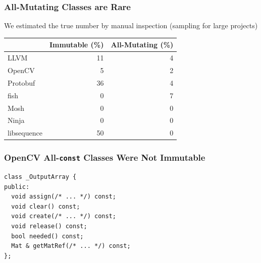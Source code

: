 \documentclass[aspectratio=169]{beamer}
\begin{document}
  \begin{frame}
    \frametitle{All-Mutating Classes are Rare}

    We estimated the true number by manual inspection (sampling for large
    projects)

    \vspace{2em}

    \begin{center}\begin{tabular}{l r r}
                  & Immutable (\%) & All-Mutating (\%) \\
      \hline
      LLVM        & 11 & 4 \\
      OpenCV      &  5 & 2 \\
      Protobuf    & 36 & 4 \\
      fish        &  0 & 7 \\
      Mosh        &  0 & 0 \\
      Ninja       &  0 & 0 \\
      libsequence & 50 & 0 \\
    \end{tabular}\end{center}
  \end{frame}

  \begin{frame}[fragile]
    \frametitle{OpenCV All-\texttt{const} Classes Were Not Immutable}

    \begin{lstlisting}
class _OutputArray {
public:
  void assign(/* ... */) const;
  void clear() const;
  void create(/* ... */) const;
  void release() const;
  bool needed() const;
  Mat & getMatRef(/* ... */) const;
};
    \end{lstlisting}
  \end{frame}
\end{document}
